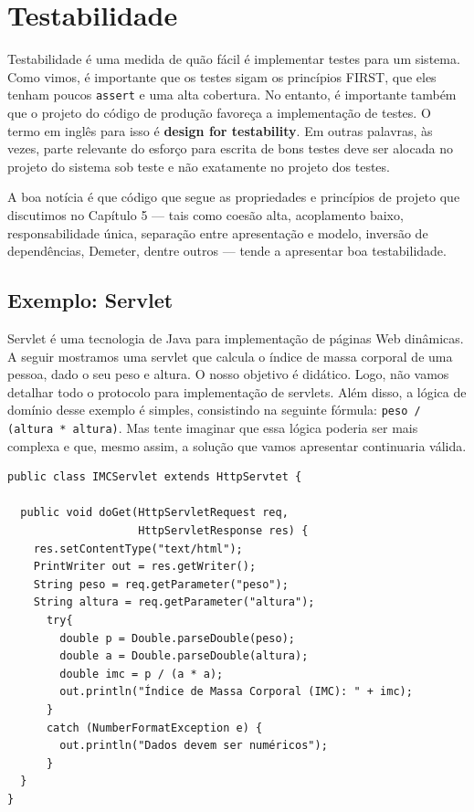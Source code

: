 \documentclass[
  11pt,
  twoside]{book}
\newcommand{\passthrough}[1]{#1}
\begin{document}
\hypertarget{testabilidade}{%
\section{Testabilidade}\label{testabilidade}}

 

Testabilidade é uma medida de quão fácil é implementar testes para um
sistema. Como vimos, é importante que os testes sigam os princípios
FIRST, que eles tenham poucos \passthrough{\lstinline!assert!} e uma
alta cobertura. No entanto, é importante também que o projeto do código
de produção favoreça a implementação de testes. O termo em inglês para
isso é \textbf{design for testability}. Em outras palavras, às vezes,
parte relevante do esforço para escrita de bons testes deve ser alocada
no projeto do sistema sob teste e não exatamente no projeto dos testes.

A boa notícia é que código que segue as propriedades e princípios de
projeto que discutimos no Capítulo 5 --- tais como coesão alta,
acoplamento baixo, responsabilidade única, separação entre apresentação
e modelo, inversão de dependências, Demeter, dentre outros --- tende a
apresentar boa testabilidade.

\hypertarget{exemplo-servlet}{%
\subsection{Exemplo: Servlet}\label{exemplo-servlet}}

Servlet é uma tecnologia de Java para implementação de páginas Web
dinâmicas. A seguir mostramos uma servlet que calcula o índice de massa
corporal de uma pessoa, dado o seu peso e altura. O nosso objetivo é
didático. Logo, não vamos detalhar todo o protocolo para implementação
de servlets. Além disso, a lógica de domínio desse exemplo é simples,
consistindo na seguinte fórmula:
\passthrough{\lstinline!peso / (altura * altura)!}. Mas tente imaginar
que essa lógica poderia ser mais complexa e que, mesmo assim, a solução
que vamos apresentar continuaria válida.

\begin{lstlisting}
public class IMCServlet extends HttpServtet {

  public void doGet(HttpServletRequest req, 
                    HttpServletResponse res) {
    res.setContentType("text/html");
    PrintWriter out = res.getWriter();
    String peso = req.getParameter("peso");
    String altura = req.getParameter("altura");
      try{
        double p = Double.parseDouble(peso);
        double a = Double.parseDouble(altura);
        double imc = p / (a * a);
        out.println("Índice de Massa Corporal (IMC): " + imc);
      }
      catch (NumberFormatException e) {
        out.println("Dados devem ser numéricos");
      }
  }
}  
\end{lstlisting}
\end{document}
